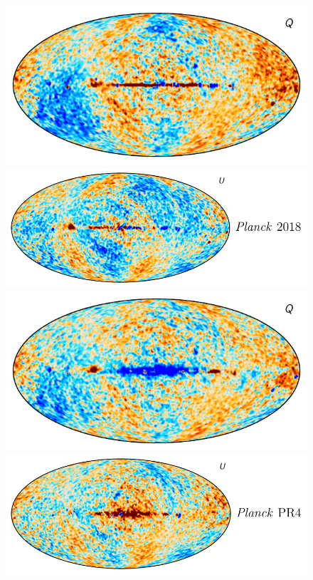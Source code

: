 \documentclass[twocolumn]{../../common/aa}
\begin{document}
\begin{figure}
	\includegraphics[height=0.15\textheight]{figures/diff_18_DR5_Q.pdf}
	\includegraphics[height=0.15\textheight]{figures/diff_18_DR5_U.pdf}
	\newline
	\includegraphics[height=0.15\textheight]{figures/diff_NPIPE_DR5_Q.pdf}
	\includegraphics[height=0.15\textheight]{figures/diff_NPIPE_DR5_U.pdf}

\end{figure}
\end{document}
